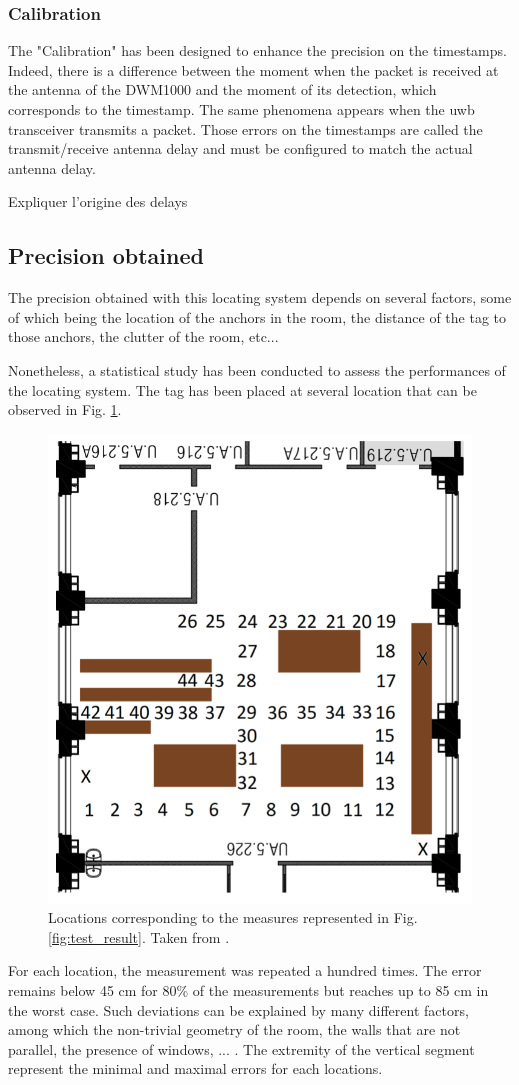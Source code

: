 \subsubsection{Calibration}

The "Calibration" has been designed to enhance the precision on the timestamps. Indeed, there is a difference between the moment when the packet is received at the antenna of the DWM1000 and the moment of its detection, which corresponds to the timestamp. The same phenomena appears when the \gls{uwb} transceiver transmits a packet. Those errors on the timestamps are called the transmit/receive antenna delay and must be configured to match the actual antenna delay.

\color{red} Expliquer l'origine des delays \color{black}

\subsection{Precision obtained}

The precision obtained with this locating system depends on several factors, some of which being the location of the anchors in the room, the distance of the tag to those anchors, the clutter of the room, etc...
\vspace{2mm}

Nonetheless, a statistical study has been conducted to assess the performances of the locating system. The tag has been placed at several location that can be observed in Fig. \ref{fig:test_map}.

\begin{figure}[H]
	\centering
	\includegraphics[width=.35\linewidth]{Images/test_map.png}
	\caption{Locations corresponding to the measures represented in Fig. \ref{fig:test_result}. Taken from \cite{hannotier2019indoor}.}
	\label{fig:test_map}
\end{figure}

For each location, the measurement was repeated a hundred times. The error remains below 45 cm for 80\% of the measurements but reaches up to 85 cm in the worst case. Such deviations can be explained by many different factors, among which the non-trivial geometry of the room, the walls that are not parallel, the presence of windows, ... \cite{hannotier2019indoor}. The extremity of the vertical segment represent the minimal and maximal errors for each locations.
\vspace{2mm}

